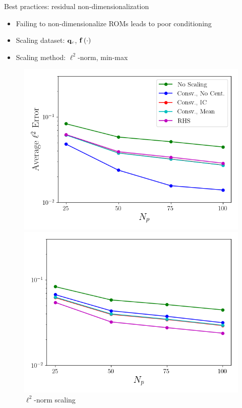 \documentclass[]{beamer}
\begin{document}
\begin{frame}{Best practices: residual non-dimensionalization}
	\begin{itemize}
		\item Failing to non-dimensionalize ROMs leads to poor conditioning
		\item Scaling dataset: $\mathbf{q}_{c}$, $\mathbf{f} \left(\cdot\right)$
		\item Scaling method: $\ell^2$-norm, min-max
	\end{itemize}
	\begin{figure}
		\centering
			\begin{minipage}{0.4\linewidth}
				\includegraphics[width=0.99\linewidth]{Images/experiments/cvrc/best_pract/errVsModes_norm_l2_Average_errorRaw.png}
				\caption*{$\ell^2$-norm scaling}
			\end{minipage}
			\begin{minipage}{0.4\linewidth}
				\includegraphics[width=0.99\linewidth]{Images/experiments/cvrc/best_pract/errVsModes_norm_minmax_Average_errorRaw.png}

\end{minipage}
\end{figure}
\end{frame}
\end{document}
